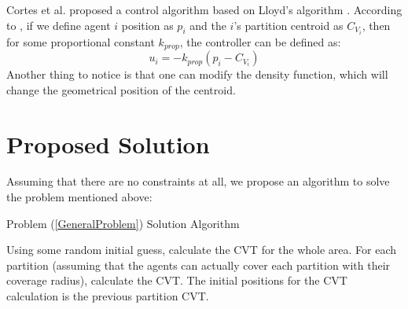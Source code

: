 \documentclass{iacas}
\begin{document}
Cortes et al. proposed a control algorithm based on Lloyd's algorithm \cite{Cortes2004}. According to \cite{Cortes2004}, if we define agent $i$ position as $p_i$ and the $i$'s partition centroid as $C_{V_{i}}$, then for some proportional constant $k_{prop}$, the controller can be defined as:
\begin{equation} \label{LloydsContol}
u_{i} = -k_{prop}\left( p_i - C_{V_{i}} \right)
\end{equation} 
%
Another thing to notice is that one can modify the density function, which will change the geometrical position of the centroid.




\section{Proposed Solution}
Assuming that there are no constraints at all, we propose an algorithm to solve the problem mentioned above:
\begin{algorithm}[H]
\caption{Problem (\ref{GeneralProblem}) Solution Algorithm}\label{GeneralProbSolution}
\begin{algorithmic}[1]
\State Using some random initial guess, calculate the CVT for the whole area.
\State For each partition (assuming that the agents can actually cover each partition with their coverage radius), calculate the CVT. The initial positions for the CVT calculation is the previous partition CVT.
\end{algorithmic}
\end{algorithm}
\end{document}
